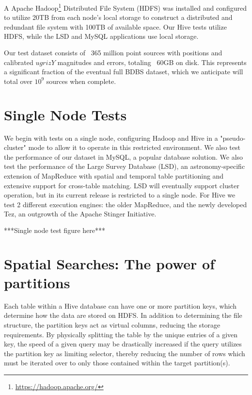 \documentclass[11pt,twoside]{article}
\begin{document}
A Apache Hadoop\footnote{\url{https://hadoop.apache.org/}} Distributed File System (HDFS) was installed and configured to utilize 20TB from each node's local storage to construct a distributed and redundant file system with 100TB of available space.  Our Hive tests utilize HDFS, while the LSD and MySQL applications use local storage.  

Our test dataset consists of ~365 million point sources with positions and calibrated $ugrizY$ magnitudes and errors, totaling ~60GB on disk.  This represents a significant fraction of the eventual full BDBS dataset, which we anticipate will total over $10^9$ sources when complete.

\section{Single Node Tests}
We begin with tests on a single node, configuring Hadoop and Hive in a "pseudo-cluster" mode to allow it to operate in this restricted environment.  We also test the performance of our dataset in MySQL, a popular database solution.  We also test the performance of the Large Survey Database (LSD), an astronomy-specific extension of MapReduce with spatial and temporal table partitioning and extensive support for cross-table matching.  LSD will eventually support cluster operation, but in its current release is restricted to a single node.  For Hive we test 2 different execution engines: the older MapReduce, and the newly developed Tez, an outgrowth of the Apache Stinger Initiative.  

***Single node test figure here***

\section{Spatial Searches: The power of partitions}
\label{spatial}
Each table within a Hive database can have one or more partition keys, which determine how the data are stored on HDFS.  In addition to determining the file structure, the partition keys act as virtual columns, reducing the storage requirements.  By physically splitting the table by the unique entries of a given key, the speed of a given query may be drastically increased if the query utilizes the partition key as limiting selector, thereby reducing the number of rows which must be iterated over to only those contained within the target partition(s).
\end{document}
